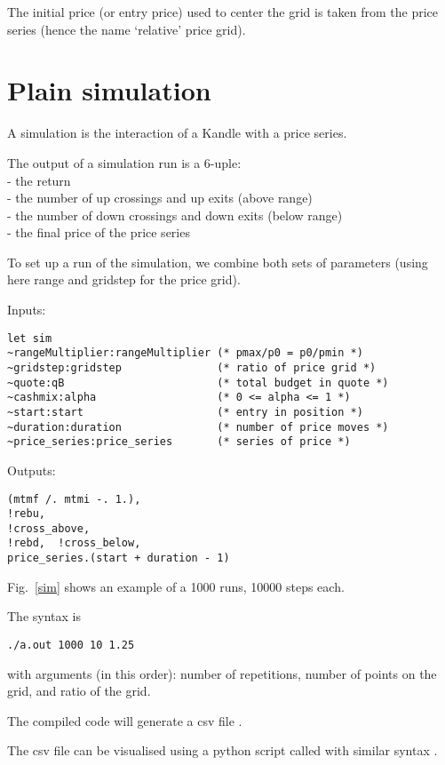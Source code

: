 \documentclass[oneside,10pt]{article}
\begin{document}
The initial price (or entry price) 
used to center the grid is taken from the price series (hence the name `relative' price grid).

\section{Plain simulation}
A simulation is the interaction of a Kandle with a price series.

The output of a simulation run is a 6-uple:
\\- the return
\\- the number of up crossings and up exits (above range)
\\- the number of down crossings and down exits (below range)
\\- the final price of the price series

To set up a run of the simulation, 
we combine both sets of parameters (using here range and gridstep for the price grid).

Inputs:
\begin{verbatim}
let sim 
~rangeMultiplier:rangeMultiplier (* pmax/p0 = p0/pmin *)
~gridstep:gridstep               (* ratio of price grid *)
~quote:qB                        (* total budget in quote *)
~cashmix:alpha                   (* 0 <= alpha <= 1 *)
~start:start                     (* entry in position *)
~duration:duration               (* number of price moves *)
~price_series:price_series       (* series of price *)
\end{verbatim}

Outputs:
\begin{verbatim}
(mtmf /. mtmi -. 1.), 
!rebu, 
!cross_above, 
!rebd,  !cross_below, 
price_series.(start + duration - 1)
\end{verbatim}

Fig.~\ref{sim} shows an example of a 1000 runs, 10000 steps each. 

The syntax is
\begin{verbatim}
./a.out 1000 10 1.25
\end{verbatim}
with arguments (in this order): number of repetitions, number of points on the grid, and ratio of the grid. 

The compiled code will generate a csv file . 

The csv file can be visualised using a python script called  with similar syntax .
\end{document}
